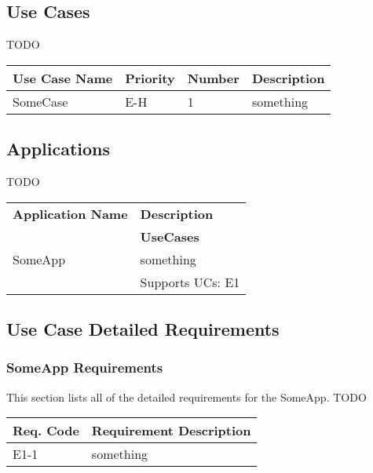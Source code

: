 \documentclass[12pt]{article}
\begin{document}
\subsection{Use Cases}

TODO

\begin{table}[!h]
	\begin{tabular}{| l | l | l | l |}
		\hline
		\textbf{Use Case Name} & \textbf{Priority} & \textbf{Number} & \textbf{Description}\\
		\hline
		SomeCase	& E-H & 1 & something\\
		\hline
	\end{tabular}
	\label{tab:UseCases}
\end{table}

\subsection{Applications}

TODO

\begin{table}[!h]
	\begin{tabular}{| l | l |}
		\hline
		\textbf{Application Name} & \textbf{Description}\\ \cline{2-1}
															& \textbf{UseCases}\\
		\hline
		SomeApp	& something\\ \cline{2-1}
						& Supports UCs: E1\\
		\hline
	\end{tabular}
	\label{tab:Applications}
\end{table}

\subsection{Use Case Detailed Requirements}

\subsubsection{SomeApp Requirements}
This section lists all of the detailed requirements for the SomeApp.
TODO

\begin{table}[!h]
	\begin{tabular}{| l | l |}
	 	\hline
		\textbf{Req. Code} & \textbf{Requirement Description}\\
		\hline
		E1-1	& something\\
		\hline
	\end{tabular}
	\label{tab:SomeAppRequirements}
\end{table}
\end{document}
